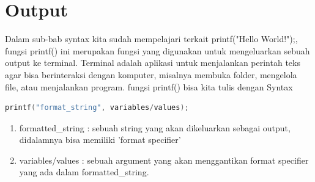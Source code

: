 \section{Output}

Dalam sub-bab syntax kita sudah mempelajari terkait printf("Hello World!");, fungsi printf() ini merupakan fungsi yang digunakan untuk mengeluarkan sebuah output ke terminal.
  Terminal adalah aplikasi untuk menjalankan perintah teks agar bisa berinteraksi dengan komputer, misalnya membuka folder, mengelola file, atau menjalankan program.
  fungsi printf() bisa kita tulis dengan Syntax
{
\captionsetup[lstlisting]{labelformat=empty, justification=raggedright, singlelinecheck=false} %
\begin{lstlisting}[language=c, caption={syntax}]
	printf("format_string", variables/values);
\end{lstlisting}
}
\begin{enumerate}[label={}, leftmargin=*]
	\item formatted\_string : sebuah string yang akan dikeluarkan sebagai output, didalamnya bisa memiliki 'format specifier'
	\item variables/values : sebuah argument yang akan menggantikan format specifier yang ada dalam formatted\_string.
\end{enumerate}


